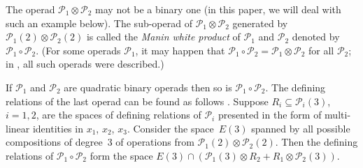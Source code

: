The operad $\mathcal P_1\otimes \mathcal P_2$ may not be a binary one (in this paper, we will deal
with such an example below). The sub-operad of $\mathcal P_1\otimes \mathcal P_2$ generated
by $\mathcal P_1(2)\otimes \mathcal P_2(2)$ is
called the {\em Manin white product} of $\mathcal P_1$ and $\mathcal P_2$ denoted by
$\mathcal P_1\circ\mathcal P_2$.
(For some operads $\mathcal P_1$, it may happen that
$\mathcal P_1\circ \mathcal P_2 = \mathcal P_1\otimes \mathcal P_2$
for all $\mathcal P_2$; in \cite{Vallette2008}, all such operads were described.)

If $\mathcal P_1$ and $\mathcal P_2$ are quadratic binary operads then so is
$\mathcal P_1\circ \mathcal P_2$. The defining relations of the last operad can be found
as follows \cite{GK-1994}. Suppose $R_i\subseteq \mathcal P_i(3)$,
$i=1,2$, are the spaces of defining relations of
$\mathcal P_i$ presented in the form of multi-linear identities in $x_1$, $x_2$, $x_3$.
Consider the space~$E(3)$ spanned by all possible compositions of degree~3 of operations from
$\mathcal P_1(2)\otimes \mathcal P_2(2)$.
Then the defining relations of $\mathcal P_1\circ \mathcal P_2$
form the space $E(3)\cap (\mathcal P_1(3)\otimes R_2 + R_1\otimes \mathcal P_2(3))$.

